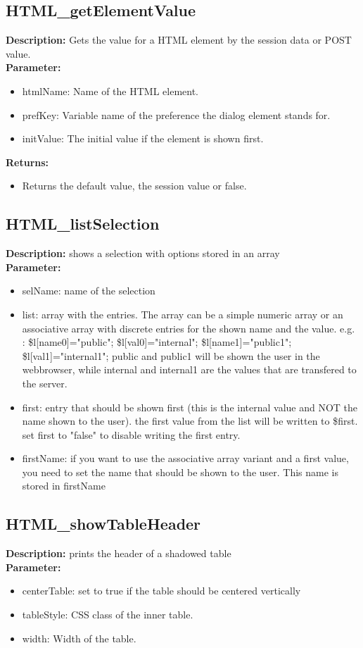 \subsection{HTML\_getElementValue}
\textbf{Description:} Gets the value for a HTML element by the session data or POST value.\\
\textbf{Parameter:}
\begin{itemize}
\item htmlName: Name of the HTML element.
\item prefKey: Variable name of the preference the dialog element stands for.
\item initValue: The initial value if the element is shown first.
\end{itemize}
\textbf{Returns:}
\begin{itemize}
\item Returns the default value, the session value or false.
\end{itemize}

\subsection{HTML\_listSelection}
\textbf{Description:} shows a selection with options stored in an array\\
\textbf{Parameter:}
\begin{itemize}
\item selName: name of the selection
\item list: array with the entries. The array can be a simple numeric array or an associative array with discrete entries for the shown name and the value. e.g. : \$l[name0]="public"; \$l[val0]="internal"; \$l[name1]="public1"; \$l[val1]="internal1"; public and public1 will be shown the user in the webbrowser, while internal and internal1 are the values that are transfered to the server.
\item first: entry that should be shown first (this is the internal value and NOT the name shown to the user). the first value from the list will be written to \$first. set first to "false" to disable writing the first entry.
\item firstName: if you want to use the associative array variant and a first value, you need to set the name that should be shown to the user. This name is stored in firstName
\end{itemize}

\subsection{HTML\_showTableHeader}
\textbf{Description:} prints the header of a shadowed table\\
\textbf{Parameter:}
\begin{itemize}
\item centerTable: set to true if the table should be centered vertically
\item tableStyle: CSS class of the inner table.
\item width: Width of the table.
\end{itemize}

